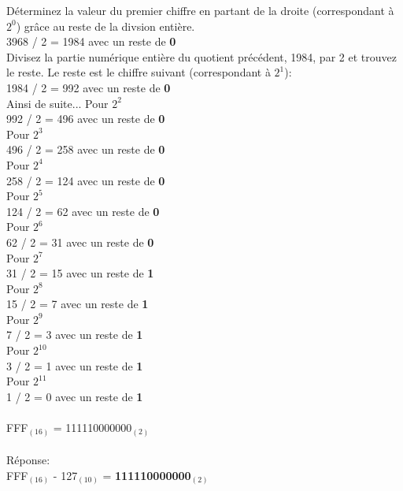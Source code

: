 \begin{Exercice}[20 minutes]
\begin{solution}
        Déterminez la valeur du premier chiffre en partant de la droite (correspondant à $2^0$) grâce au reste de la divsion entière.\\
        3968 / 2 = 1984 avec un reste de \textbf{0}\\
        Divisez la partie numérique entière du quotient précédent, 1984, par 2 et trouvez le reste. Le reste est le chiffre suivant (correspondant à $2^1$):\\
        1984 / 2 = 992 avec un reste de \textbf{0}\\
        Ainsi de suite... Pour $2^2$\\
        992 / 2 = 496 avec un reste de \textbf{0}\\
        Pour $2^3$\\
        496 / 2 = 258 avec un reste de \textbf{0}\\
        Pour $2^4$\\
        258 / 2 = 124 avec un reste de \textbf{0}\\
        Pour $2^5$\\
        124 / 2 = 62 avec un reste de \textbf{0}\\
        Pour $2^6$\\
        62 / 2 = 31 avec un reste de \textbf{0}\\
        Pour $2^7$\\
        31 / 2 = 15 avec un reste de \textbf{1}\\
        Pour $2^8$\\
        15 / 2 = 7 avec un reste de \textbf{1}\\
        Pour $2^9$\\
        7 / 2 = 3 avec un reste de \textbf{1}\\
        Pour $2^10$\\
        3 / 2 = 1 avec un reste de \textbf{1}\\
        Pour $2^11$\\
        1 / 2 = 0 avec un reste de \textbf{1}\\\\

        FFF$_{(16)}$ = 111110000000$_{(2)}$\\\\

        Réponse:\\
        FFF$_{(16)}$ - 127$_{(10)}$ = \textbf{111110000000$_{(2)}$}
    \end{solution}

\end{Exercice}


